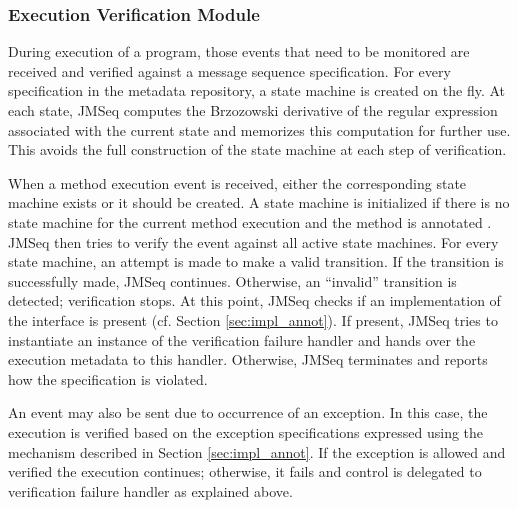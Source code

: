 \subsubsection{Execution Verification Module} \label{sec:exec_verify}

During execution of a program, those events that need to be monitored are received and
verified against a message sequence specification. 
For every specification in the metadata repository, a state machine is created on the fly.
At each state, JMSeq computes the Brzozowski derivative of the regular expression associated with the current state and memorizes this computation for further use. 
This avoids the full construction of the state machine at each step of verification. 

When a method execution event is received, either the corresponding state machine exists or it should be created.
A state machine is initialized if there is no state machine for the current method execution and the method is annotated  .
JMSeq then tries to verify the event against all active state machines.
For every state machine, an attempt is made to make a valid transition.
If the transition is successfully made, JMSeq continues.
Otherwise, an ``invalid'' transition is detected; verification stops.
At this point, JMSeq checks if an implementation of the
 interface is present (cf. Section \ref{sec:impl_annot}).
If present, JMSeq tries to instantiate an instance of the verification failure handler and hands over the execution metadata to this handler. 
Otherwise, JMSeq terminates and reports how the specification is violated.

An event may also be sent due to occurrence of an exception. 
In this case, the execution is verified based on the exception specifications expressed using the mechanism described in Section \ref{sec:impl_annot}. 
If the exception is allowed and verified the execution continues; otherwise, it fails and control is delegated to verification failure handler as explained above.


